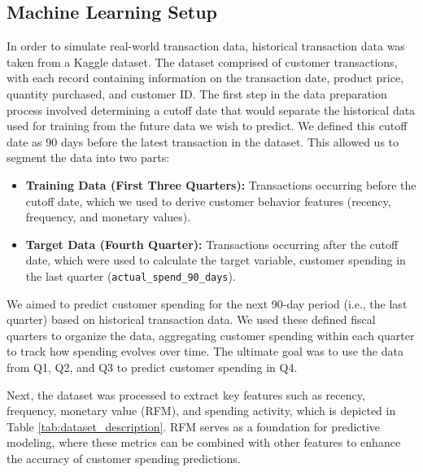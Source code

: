 \documentclass{scrartcl}
\begin{document}
\subsection{Machine Learning Setup}

In order to simulate real-world transaction data, historical transaction data was taken from a Kaggle dataset\cite{rehman2023retail}. The dataset comprised of customer transactions, with each record containing information on the transaction date, product price, quantity purchased, and customer ID. The first step in the data preparation process involved determining a cutoff date that would separate the historical data used for training from the future data we wish to predict. We defined this cutoff date as 90 days before the latest transaction in the dataset. This allowed us to segment the data into two parts:

\begin{itemize}
	\item \textbf{Training Data (First Three Quarters):} Transactions occurring before the cutoff date, which we used to derive customer behavior features (recency, frequency, and monetary values).
	\item \textbf{Target Data (Fourth Quarter):} Transactions occurring after the cutoff date, which were used to calculate the target variable, customer spending in the last quarter (\texttt{actual\_spend\_90\_days}).
\end{itemize}

We aimed to predict customer spending for the next 90-day period (i.e., the last quarter) based on historical transaction data. We used these defined fiscal quarters to organize the data, aggregating customer spending within each quarter to track how spending evolves over time. The ultimate goal was to use the data from Q1, Q2, and Q3 to predict customer spending in Q4.

Next, the dataset was processed to extract key features such as recency, frequency, monetary value (RFM), and spending activity, which is depicted in Table \ref{tab:dataset_description}. RFM serves as a foundation for predictive modeling, where these metrics can be combined with other features to enhance the accuracy of customer spending predictions.
\end{document}

